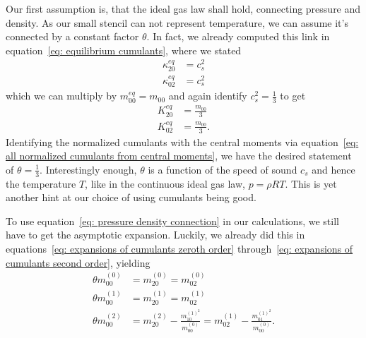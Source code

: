 Our first assumption is, that the ideal gas law shall hold, connecting pressure and density.
As our small stencil can not represent temperature, we can assume it's connected by a constant factor $\theta$.
In fact, we already computed this link in equation~\eqref{eq: equilibrium cumulants}, where we stated
\begin{equation}
  \begin{aligned}
    \kappa_{20}^{eq} & = c_s^2  \\
    \kappa_{02}^{eq} & = c_s^2
  \end{aligned}
\end{equation}
which we can multiply by $m_{00}^{eq} = m_{00}$ and again identify $c_s^2=\frac{1}{3}$ to get
\begin{equation}
\label{eq: pressure density connection}
  \begin{aligned}
    K_{20}^{eq} & = \frac{m_{00}}{3}  \\
    K_{02}^{eq} & = \frac{m_{00}}{3}.
  \end{aligned}
\end{equation}
Identifying the normalized cumulants with the central moments via equation~\eqref{eq: all normalized cumulants from central moments}, we have the desired statement of $\theta=\frac{1}{3}$.
Interestingly enough, $\theta$ is a function of the speed of sound $c_s$ and hence the temperature $T$, like in the continuous ideal gas law, $p=\rho RT$.
This is yet another hint at our choice of using cumulants being good.

To use equation~\eqref{eq: pressure density connection} in our calculations, we still have to get the asymptotic expansion.
Luckily, we already did this in equations~\eqref{eq: expansions of cumulants zeroth order} through~\eqref{eq: expansions of cumulants second order}, yielding
\begin{align}
  \label{eq: ideal gas zeroth order}
  \theta m_{00}^{(0)} &= m_{20}^{(0)} = m_{02}^{(0)}
  \\
  \label{eq: ideal gas first order}
  \theta m_{00}^{(1)} &= m_{20}^{(1)} = m_{02}^{(1)}
  \\
  \label{eq: ideal gas second order}
  \theta m_{00}^{(2)} &= m_{20}^{(2)} - \frac{m_{10}^{{(1)}^2}}{m_{00}^{(0)}}  = m_{02}^{(1)} - \frac{m_{01}^{{(1)}^2}}{m_{00}^{(0)}}.
\end{align}
